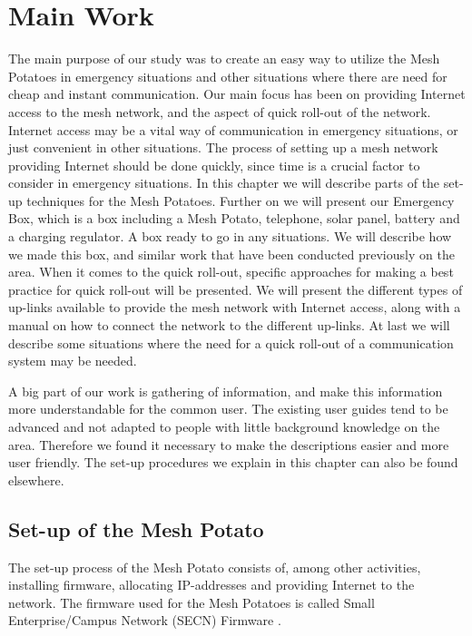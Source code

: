 \chapter{Main Work}
\label{chp:quickrollout} 

The main purpose of our study was to create an easy way to utilize the Mesh Potatoes in emergency situations and other situations where there are need for cheap and instant communication. Our main focus has been on providing Internet access to the mesh network, and the aspect of quick roll-out of the network. Internet access may be a vital way of communication in emergency situations, or just convenient in other situations. The process of setting up a mesh network providing Internet should be done quickly, since time is a crucial factor to consider in emergency situations. In this chapter we will describe parts of the set-up techniques for the Mesh Potatoes. Further on we will present our Emergency Box, which is a box including a Mesh Potato, telephone, solar panel, battery and a charging regulator. A box ready to go in any situations. We will describe how we made this box, and similar work that have been conducted previously on the area. When it comes to the quick roll-out, specific approaches for making a best practice for quick roll-out will be presented. We will present the different types of up-links available to provide the mesh network with Internet access, along with a manual on how to connect the network to the different up-links. At last we will describe some situations where the need for a quick roll-out of a communication system may be needed. 

A big part of our work is gathering of information, and make this information more understandable for the common user. The existing user guides tend to be advanced and not adapted to people with little background knowledge on the area. Therefore we found it necessary to make the descriptions easier and more user friendly. The set-up procedures we explain in this chapter can also be found elsewhere. 


\section{Set-up of the Mesh Potato}
The set-up process of the Mesh Potato consists of, among other activities, installing firmware, allocating IP-addresses and providing Internet to the network. The firmware used for the Mesh Potatoes is called Small Enterprise/Campus Network (SECN) Firmware \cite{ChoosingFirmware}. 

